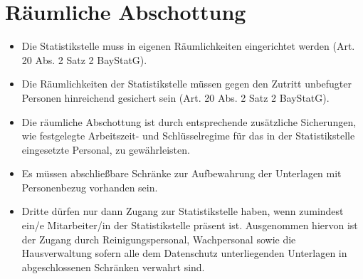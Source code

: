  \section{Räumliche Abschottung}
    \begin{itemize}
        \item Die Statistikstelle muss in eigenen Räumlichkeiten eingerichtet werden (Art. 20 Abs. 2 Satz 2 BayStatG).
        \item Die Räumlichkeiten der Statistikstelle müssen gegen den Zutritt unbefugter Personen hinreichend gesichert sein (Art. 20 Abs. 2 Satz 2 BayStatG).
        \item Die räumliche Abschottung ist durch entsprechende zusätzliche Sicherungen, wie festgelegte Arbeitszeit- und Schlüsselregime für das in der Statistikstelle eingesetzte Personal, zu gewährleisten.
        \item Es müssen abschließbare Schränke zur Aufbewahrung der Unterlagen mit Personenbezug vorhanden sein.
        \item Dritte dürfen nur dann Zugang zur Statistikstelle haben, wenn zumindest ein/e Mitarbeiter/in der Statistikstelle präsent ist. Ausgenommen hiervon ist der Zugang durch Reinigungspersonal, Wachpersonal sowie die Hausverwaltung sofern alle dem Datenschutz unterliegenden Unterlagen in abgeschlossenen Schränken verwahrt sind.
    \end{itemize}

